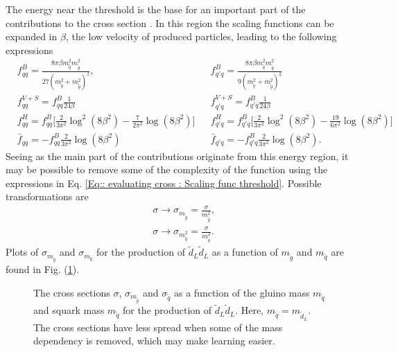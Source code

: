\documentclass[twoside,english]{uiofysmaster}
\begin{document}
The energy near the threshold is the base for an important part of the contributions to the cross section \cite{beenakker1997squark}. In this region the scaling functions can be expanded in $\beta$, the low velocity of produced particles, leading to the following expressions \cite{beenakker1997squark}
\begin{align}
&f_{qq}^B = \frac{8 \pi \beta m_{\tilde{q}}^2 m_{\tilde{g}}^2}{27(m_{\tilde{q}}^2 + m_{\tilde{g}}^2)^2}, &&f_{q'q}^B = \frac{8 \pi \beta m_{\tilde{q}}^2 m_{\tilde{g}}^2}{9(m_{\tilde{q}}^2 + m_{\tilde{g}}^2)^2} \nonumber \\
& f_{qq}^{V+S} = f_{qq}^B \frac{1}{24 \beta} && f_{q'q}^{V+S} = f_{q'q}^B \frac{1}{24 \beta} \nonumber \\
&f_{qq}^H = f_{qq}^B \Big[\frac{2}{3 \pi^2} \log^2(8 \beta^2) - \frac{7}{2 \pi^2} \log (8 \beta^2) \Big] &&f_{q'q}^H = f_{q'q}^B \Big[\frac{2}{3 \pi^2} \log^2(8 \beta^2) - \frac{19}{6 \pi^2} \log (8 \beta^2) \Big] \nonumber \\
& \bar{f}_{qq} = - f_{qq}^B \frac{2}{3 \pi^2} \log (8 \beta^2) &&\bar{f}_{q'q} = - f_{q'q}^B \frac{2}{3 \pi^2} \log (8 \beta^2).\label{Eq:: evaluating cross : Scaling func threshold}
\end{align}
Seeing as the main part of the contributions originate from this energy region, it may be possible to remove some of the complexity of the function using the expressions in Eq. \ref{Eq:: evaluating cross : Scaling func threshold}. Possible transformations are
\begin{align}
&\sigma \rightarrow \sigma_{m_{\tilde{g}}} = \frac{\sigma}{m_{\tilde{g}}^2},\\
&\sigma \rightarrow \sigma_{m_{\tilde{q}}^2} = \frac{\sigma}{m_{\tilde{q}}^2}.
\end{align}
Plots of $\sigma_{m_{\tilde{g}}}$ and $\sigma_{m_{\tilde{q}}}$ for the production of $\tilde{d}_L \tilde{d}_L$ as a function of $m_{\tilde{g}}$ and $m_{\tilde{q}}$ are found in Fig. (\ref{Fig:: evaluating cross : Comparison sigma and sigma/m}).

\begin{figure}
\centering
\caption{The cross sections $\sigma$, $\sigma_{m_{\tilde{g}}}$ and $\sigma_{\tilde{q}}$ as a function of the gluino mass $m_{\tilde{q}}$ and squark mass $m_{\tilde{q}}$ for the production of $\tilde{d}_L \tilde{d}_L$. Here, $m_{\tilde{q}} = m_{\tilde{d}_L}$. The cross sections have less spread when some of the mass dependency is removed, which may make learning easier.}
\label{Fig:: evaluating cross : Comparison sigma and sigma/m}
\end{figure}
\end{document}
